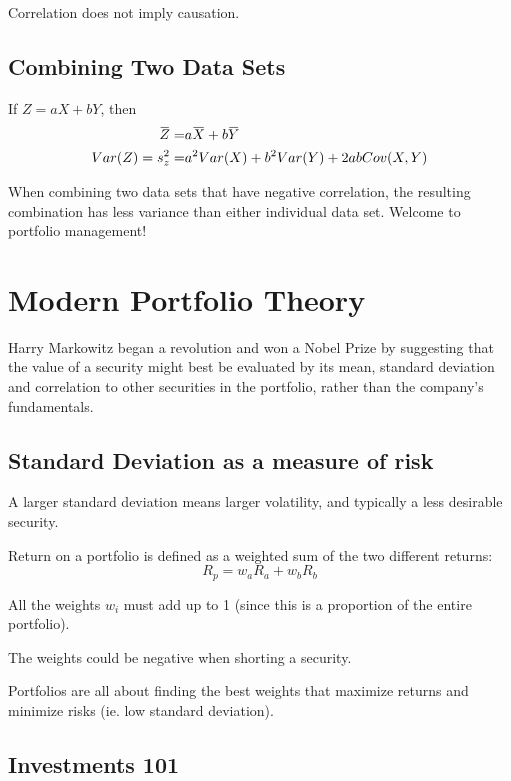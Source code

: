 \documentclass[11pt, oneside]{article}   	%
\newcommand{\overbar}[1]{\mkern 1.5mu\overline{\mkern-1.5mu#1\mkern-1.5mu}\mkern 1.5mu}
\begin{document}
\begin{center}
\Large{Correlation does not imply causation.}
\end{center}

\subsection{Combining Two Data Sets}

If $Z = aX + bY$, then
\begin{align*}
\overbar{Z} =& a\overbar{X} + b\overbar{Y}\\
Var(Z) =  s^2_z =& a^2Var(X) + b^2Var(Y) + 2abCov(X,Y)\\
\end{align*}

When combining two data sets that have negative correlation, the resulting combination has less variance than either individual data set. Welcome to portfolio management!

\section{Modern Portfolio Theory}

Harry Markowitz began a revolution and won a Nobel Prize by suggesting that the value of a security might best be evaluated by its mean, standard deviation and correlation to other securities in the portfolio, rather than the company's fundamentals.

\subsection{Standard Deviation as a measure of risk}

A larger standard deviation means larger volatility, and typically a less desirable security.

Return on a portfolio is defined as a weighted sum of the two different returns:
\[
R_p = w_a R_a + w_b R_b
\]

All the weights $w_i$ must add up to 1 (since this is a proportion of the entire portfolio).

The weights could be negative when shorting a security.

Portfolios are all about finding the best weights that maximize returns and minimize risks (ie. low standard deviation).

\subsection{Investments 101}
\end{document}
